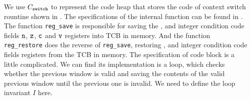 We use $C_{\texttt{switch}}$ to represent the 
code heap that stores the code of context switch rountine shown 
in \Fig{\ref{fig:Main function of context switch routine}}. 
The specifications of the internal function can be found in 
\Fig{\ref{fig:Specifications of Internal Functions}}. The 
function \texttt{reg\_save} is responsible for saving the 
\localRN{}, \inRN{} and integer condition code fields $\texttt{n}$, 
$\texttt{z}$, $\texttt{c}$ and $\texttt{v}$ registers into TCB in memory. 
And the function \texttt{reg\_restore} does the reverse of 
\texttt{reg\_save}, restoring \localRN{}, \inRN{} and integer 
condition code fields registers from the TCB in memory. 
The specification of code block 
\SaveUsedWin{} is a little complicated. 
We can find its implementation is a loop, which checks whether the 
previous window is valid and saving the contents of the valid 
previous window until the previous one is invalid. 
We need to define the loop invariant $I$ here.

